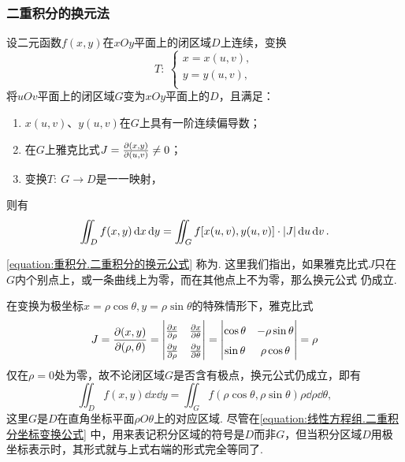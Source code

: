 \subsubsection{二重积分的换元法}
\begin{theorem}
设二元函数\(f(x,y)\)在\(xOy\)平面上的闭区域\(D\)上连续，变换\[
T :\: \left\{ \begin{array}{l}
x = x(u,v), \\
y = y(u,v), \\
\end{array} \right.
\]将\(uOv\)平面上的闭区域\(G\)变为\(xOy\)平面上的\(D\)，且满足：
\begin{enumerate}
\item \(x(u,v)\)、\(y(u,v)\)在\(G\)上具有一阶连续偏导数；
\item 在\(G\)上雅克比式\(J = \pdv{ (x,y) }{ (u,v) } \neq 0\)；
\item 变换\(T :\: G \to D\)是一一映射，
\end{enumerate}
则有\begin{equation}\label{equation:重积分.二重积分的换元公式}
\iint_D f(x,y) \dd{x} \dd{y}
=\iint_G f[x(u,v),y(u,v)] \cdot \abs{J} \dd{u} \dd{v}.
\end{equation}
\end{theorem}
\cref{equation:重积分.二重积分的换元公式} 称为.
这里我们指出，如果雅克比式\(J\)只在\(G\)内个别点上，或一条曲线上为零，而在其他点上不为零，那么换元公式  仍成立.

\vspace{1cm}

在变换为极坐标\(x = \rho \cos\theta, y = \rho \sin\theta\)的特殊情形下，雅克比式\[
J = \jacobi{x,y}{\rho,\theta}
= {\def\arraystretch{1.5}
\begin{vmatrix}
\pdv{x}{\rho} & \pdv{x}{\theta} \\
\pdv{y}{\rho} & \pdv{y}{\theta}
\end{vmatrix}}
= \begin{vmatrix}
\cos\theta & -\rho \sin\theta \\
\sin\theta & \rho \cos\theta
\end{vmatrix}
= \rho
\]仅在\(\rho = 0\)处为零，故不论闭区域\(G\)是否含有极点，换元公式仍成立，即有\[
\iint_D f(x,y) \dd{x} \dd{y}
= \iint_G f(\rho \cos\theta,\rho \sin\theta) \rho \dd{\rho} \dd{\theta},
\]这里\(G\)是\(D\)在直角坐标平面\(\rho O \theta\)上的对应区域.
尽管在\cref{equation:线性方程组.二重积分坐标变换公式} 中，用来表记积分区域的符号是\(D\)而非\(G\)，但当积分区域\(D\)用极坐标表示时，其形式就与上式右端的形式完全等同了.

